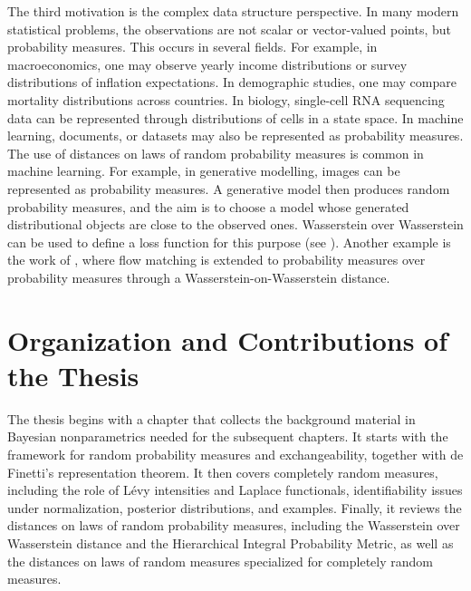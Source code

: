 The third motivation is the complex data structure perspective. In many modern statistical problems, the observations are not scalar or vector-valued points, but probability measures. This occurs in several fields. For example, in macroeconomics, one may observe yearly income distributions or survey distributions of inflation expectations. In demographic studies, one may compare mortality distributions across countries. In biology, single-cell RNA sequencing data can be represented through distributions of cells in a state space. In machine learning, documents, or datasets may also be represented as probability measures. The use of distances on laws of random probability measures is common in machine learning. For example, in generative modelling, images can be represented as probability measures. A generative model then produces random probability measures, and the aim is to choose a model whose generated distributional objects are close to the observed ones. Wasserstein over Wasserstein can be used to define a loss function for this purpose (see \cite{dukler2019wasserstein}). Another example is the work of \cite{piening2026generalized}, where flow matching is extended to probability measures over probability measures through a Wasserstein-on-Wasserstein distance.


\section{Organization and Contributions of the Thesis}\label{section:organization_and_contributions}

The thesis begins with a chapter that collects the background material in Bayesian nonparametrics needed for the subsequent chapters. It starts with the framework for random probability measures and exchangeability, together with de Finetti's representation theorem. It then covers completely random measures, including the role of L\'evy intensities and Laplace functionals, identifiability issues under normalization, posterior distributions, and examples. Finally, it reviews the distances on laws of random probability measures, including the Wasserstein over Wasserstein distance and the Hierarchical Integral Probability Metric, as well as the distances on laws of random measures specialized for completely random measures.

